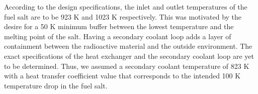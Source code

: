 According to the design specifications, the inlet and outlet temperatures of
the fuel salt are to be 923 K and 1023 K respectively. This was motivated by
the desire for a 50 K minimum buffer between the lowest temperature
and the melting point of the salt.
Having a secondary coolant loop adds a layer of containment between the
radioactive material and the outside environment. The exact specifications of
the heat exchanger and the secondary coolant loop are yet to be determined.
Thus, we assumed a secondary coolant temperature of 823 K with a heat transfer
coefficient value that corresponds to the intended 100 K temperature drop in
the fuel salt.
